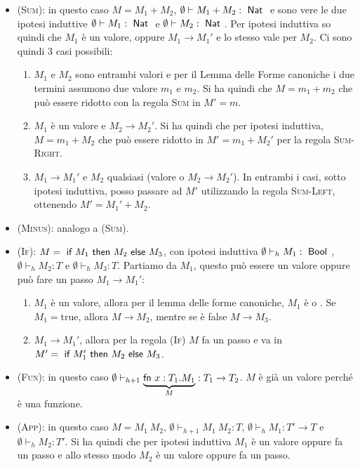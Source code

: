 \begin{itemize}
	\item \textsc{(Sum)}: in questo caso $M = M_1 +M_2$, $\emptyset \vdash M_1 + M_2 : \Nat$ e sono vere le due ipotesi induttive $\emptyset \vdash M_1 : \Nat$ e $\emptyset \vdash M_2 : \Nat$.
	Per ipotesi induttiva so quindi che $M_1$ è un valore, oppure $M_1 \rightarrow M_1'$ e lo stesso vale per $M_2$.
	Ci sono quindi 3 casi possibili:
	\begin{enumerate}[a]
		\item $M_1$ e $M_2$ sono entrambi valori e per il Lemma delle Forme canoniche i due termini assumono due valore $m_1$ e $m_2$. Si ha quindi che $M = m_1 + m_2$ che può essere ridotto con la regola \textsc{Sum} in $M' = m$.
		\item $M_1$ è un valore e $M_2 \rightarrow M_2'$. Si ha quindi che per ipotesi induttiva, $M = m_1 + M_2$ che può essere ridotto in $M' = m_1 + M_2'$ per la regola \textsc{Sum-Right}.
		\item $M_1 \rightarrow M_1'$ e $M_2$ qualsiasi (valore o $M_2 \rightarrow M_2'$). In entrambi i casi, sotto ipotesi induttiva, posso passare ad $M'$ utilizzando la regola \textsc{Sum-Left}, ottenendo $M' = M_1' + M_2$. 
	\end{enumerate}
	\item \textsc{(Minus)}: analogo a \textsc{(Sum)}.
	\item \textsc{(If)}: $ M = \iif M_1 \then M_2 \eelse M_3$, con ipotesi induttiva $\emptyset \vdash_h M_1 : \Bool$, $\emptyset \vdash_h M_2 : T$ e $\emptyset \vdash_h M_3 : T$. 
	Partiamo da $M_1$, questo può essere un valore oppure può fare un passo $M_1 \rightarrow M_1'$:
	\begin{enumerate}[a]
		\item $M_1$ è un valore, allora per il lemma delle forme canoniche, $M_1$ è  o . Se $M_1 = \text{true}$, allora $M \rightarrow M_2$, mentre se è false $M \rightarrow M_3$.
		\item $M_1 \rightarrow M_1'$, allora per la regola \textsc{(If)} $M$ fa un passo e va in $M' = \iif M_1' \then M_2 \eelse M_3$.
	\end{enumerate}
	\item \textsc{(Fun)}: in questo caso $\emptyset \vdash_{h+1} \underbrace{\fn x: T_1 . M_1}_{M} : T_1 \rightarrow T_2$. $M$ è già un valore perché è una funzione.
	\item \textsc{(App)}: in questo caso $M = M_1 \: M_2$, $\emptyset \vdash_{h+1} M_1 \: M_2 : T$, $\emptyset\vdash_{h} M_1 : T'\rightarrow T $ e $\emptyset\vdash_h M_2 : T'$. Si ha quindi che per ipotesi induttiva $M_1$ è un valore oppure fa un passo e allo stesso modo $M_2$ è un valore oppure fa un passo.

\end{itemize}

